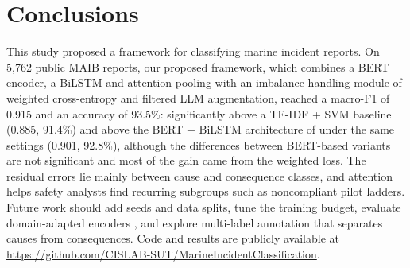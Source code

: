 \documentclass[conference]{IEEEtran}
\begin{document}
\section{Conclusions}\label{sec:conc}

This study proposed a framework for classifying marine incident reports. On 5,762 public MAIB reports, our proposed framework, which combines a BERT encoder, a BiLSTM and attention pooling with an imbalance-handling module of weighted cross-entropy and filtered LLM augmentation, reached a macro-F1 of 0.915 and an accuracy of 93.5\%: significantly above a TF-IDF + SVM baseline (0.885, 91.4\%) and above the BERT + BiLSTM architecture of \cite{zhao2025causation} under the same settings (0.901, 92.8\%), although the differences between BERT-based variants are not significant and most of the gain came from the weighted loss. The residual errors lie mainly between cause and consequence classes, and attention helps safety analysts find recurring subgroups such as noncompliant pilot ladders. Future work should add seeds and data splits, tune the training budget, evaluate domain-adapted encoders \cite{black2026domain}, and explore multi-label annotation that separates causes from consequences. Code and results are publicly available at \url{https://github.com/CISLAB-SUT/MarineIncidentClassification}.



\end{document}
